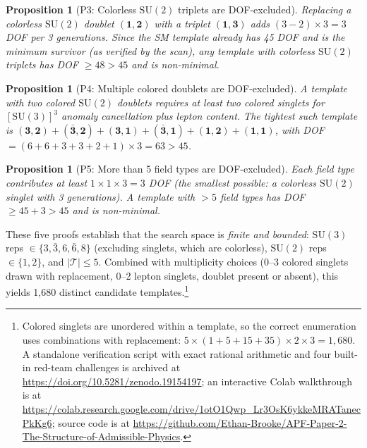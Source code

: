 \documentclass[11pt,a4paper]{article}
\newtheorem{proposition}[theorem]{Proposition}
\theoremstyle{definition}
\newcommand{\SU}{\mathrm{SU}}
\begin{document}
\begin{proposition}[P3: Colorless $\SU(2)$ triplets are DOF-excluded]
\label{prop:P3}
Replacing a colorless $\SU(2)$ doublet $(\mathbf{1}, \mathbf{2})$ with
a triplet $(\mathbf{1}, \mathbf{3})$ adds $(3-2) \times 3 = 3$ DOF per
3 generations.  Since the SM template already has 45 DOF and is the
minimum survivor (as verified by the scan), any template with colorless
$\SU(2)$ triplets has DOF $\ge 48 > 45$ and is non-minimal.
\end{proposition}

\begin{proposition}[P4: Multiple colored doublets are DOF-excluded]
\label{prop:P4}
A template with two colored $\SU(2)$ doublets requires at least two
colored singlets for $[\SU(3)]^3$ anomaly cancellation plus lepton content.
The tightest such template is
$(\mathbf{3},\mathbf{2}) + (\bar{\mathbf{3}},\mathbf{2}) +
(\mathbf{3},\mathbf{1}) + (\bar{\mathbf{3}},\mathbf{1}) +
(\mathbf{1},\mathbf{2}) + (\mathbf{1},\mathbf{1})$, with
DOF $= (6 + 6 + 3 + 3 + 2 + 1) \times 3 = 63 > 45$.
\end{proposition}

\begin{proposition}[P5: More than 5 field types are DOF-excluded]
\label{prop:P5}
Each field type contributes at least $1 \times 1 \times 3 = 3$ DOF
(the smallest possible: a colorless $\SU(2)$ singlet with 3 generations).
A template with $> 5$ field types has DOF $\ge 45 + 3 > 45$ and is
non-minimal.
\end{proposition}

\noindent These five proofs establish that the search space is
\emph{finite and bounded}: $\SU(3)$ reps $\in \{3, \bar{3}, 6,
\bar{6}, 8\}$ (excluding singlets, which are colorless),
$\SU(2)$ reps $\in \{1, 2\}$, and $|\mathcal{T}| \le 5$.
Combined with multiplicity choices (0--3 colored singlets drawn
with replacement, 0--2 lepton singlets, doublet present or absent),
this yields 1{,}680 distinct candidate templates.\footnote{Colored
singlets are unordered within a template, so the correct enumeration
uses combinations with replacement: $5 \times (1 + 5 + 15 + 35)
\times 2 \times 3 = 1{,}680$.  A standalone verification script
with exact rational arithmetic and four built-in red-team challenges
is archived at \url{https://doi.org/10.5281/zenodo.19154197}; an
interactive Colab walkthrough is at
\url{https://colab.research.google.com/drive/1otO1Qwp_Lr3OsK6ykkeMRATanecPkKg6};
source code is at
\url{https://github.com/Ethan-Brooke/APF-Paper-2-The-Structure-of-Admissible-Physics}.}
\end{document}
